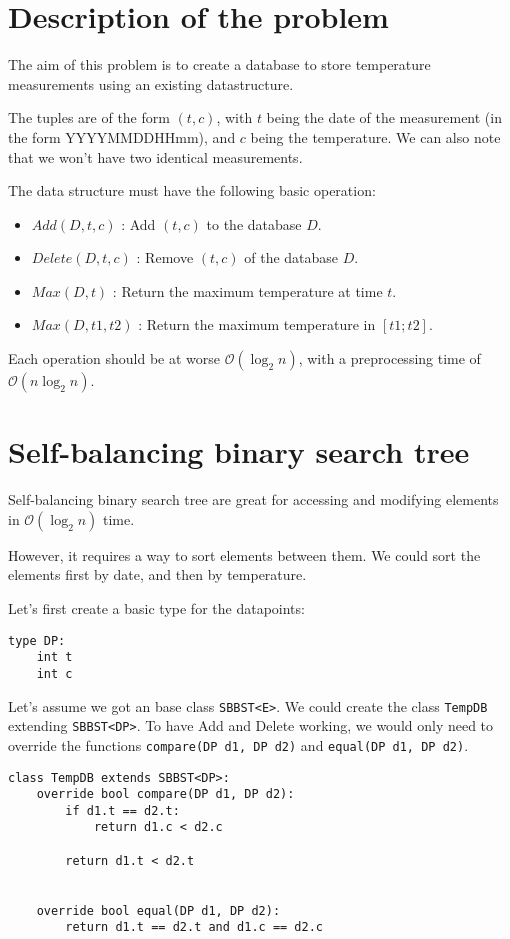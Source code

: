 \section{Description of the problem}
	The aim of this problem is to create a database to store temperature measurements using an existing datastructure.

	The tuples are of the form $(t,c)$, with $t$ being the date of the measurement (in the form YYYYMMDDHHmm), and $c$ being the temperature.
	We can also note that we won't have two identical measurements.

	The data structure must have the following basic operation:
	\begin{itemize}
		\item $Add(D, t, c)$ : Add $(t,c)$ to the database $D$.
		\item $Delete(D, t, c)$ : Remove $(t,c)$ of the database $D$.
		\item $Max(D, t)$ : Return the maximum temperature at time $t$.
		\item $Max(D, t1, t2)$ : Return the maximum temperature in $[t1 ; t2]$.
	\end{itemize}
	Each operation should be at worse $\mathcal{O}(\log_2n)$, with a preprocessing time of $\mathcal{O}(n\log_2n)$.

\section{Self-balancing binary search tree}
	Self-balancing binary search tree are great for accessing and modifying elements in $\mathcal{O}(\log_2n)$ time.

	However, it requires a way to sort elements between them. We could sort the elements first by date, and then by temperature.

	Let's first create a basic type for the datapoints:
\begin{lstlisting}
type DP:
	int t
	int c
\end{lstlisting}

	Let's assume we got an base class \verb#SBBST<E>#. We could create the class \verb#TempDB# extending \verb#SBBST<DP>#.
	To have Add and Delete working, we would only need to override the functions \verb#compare(DP d1, DP d2)# and \verb#equal(DP d1, DP d2)#.
\begin{lstlisting}
class TempDB extends SBBST<DP>:
	override bool compare(DP d1, DP d2):
		if d1.t == d2.t:
			return d1.c < d2.c

		return d1.t < d2.t


	override bool equal(DP d1, DP d2):
		return d1.t == d2.t and d1.c == d2.c
\end{lstlisting}

